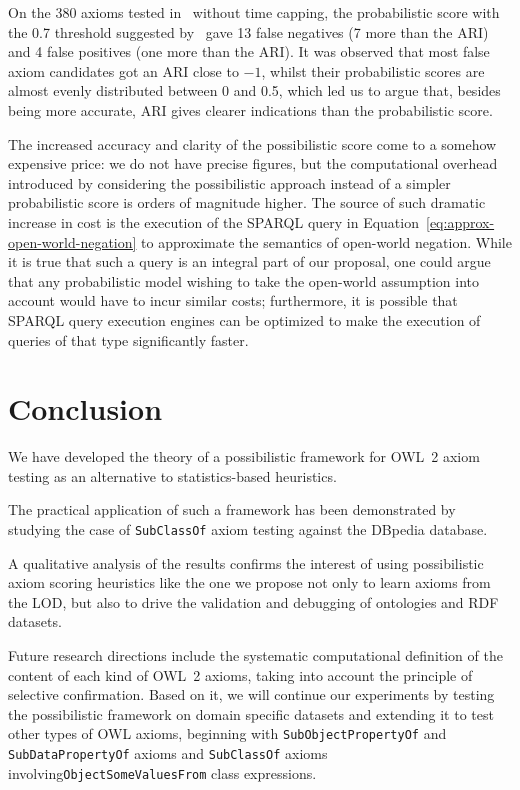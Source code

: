 \documentclass[review]{elsarticle}
\theoremstyle{definition}
\begin{document}
On the 380 axioms tested in~\cite{TettamanziFaronZuckerGandon2014ekaw}
without time capping,
the probabilistic score with the 0.7 threshold suggested by~\cite{BuehmannLehmann2012}
gave 13 false negatives (7 more than the ARI) and 4 false positives
(one more than the ARI).
It was observed that most false axiom candidates got an ARI close to $-1$,
whilst their probabilistic scores are almost evenly distributed between 0 and 0.5,
which led us to argue that, besides being more accurate,
ARI gives clearer indications than the probabilistic score.

The increased accuracy and clarity of the possibilistic score come to a somehow
expensive price: we do not have precise figures, but the computational overhead
introduced by considering the possibilistic approach instead of a simpler
probabilistic score is orders of magnitude higher. The source of such dramatic
increase in cost is the execution of the SPARQL query
in Equation~\ref{eq:approx-open-world-negation} to approximate the semantics
of open-world negation.
While it is true that such a query is an integral part of our proposal,
one could argue that any probabilistic model wishing to take the open-world
assumption into account would have to incur similar costs; furthermore,
it is possible that SPARQL query execution engines can be optimized to make
the execution of queries of that type significantly faster.


\section{Conclusion}\label{conclusion}


We have developed the theory of a possibilistic framework for OWL~2 axiom testing
as an alternative to statistics-based heuristics.

The practical application of such a framework has been demonstrated by studying
the case of \texttt{SubClassOf} axiom testing against the DBpedia database.

A qualitative analysis of the results confirms the interest of using possibilistic
axiom scoring heuristics like the one we propose not only to learn axioms from the LOD,
but also to drive the validation and debugging of ontologies and RDF datasets.

Future research directions include the systematic computational definition
of the content of each kind of OWL~2 axioms, taking into account the principle
of selective confirmation. Based on it, we will continue our experiments
by testing the possibilistic framework on domain specific datasets
and extending it to test other types of OWL axioms, beginning with
\texttt{SubObjectPropertyOf} and \texttt{SubDataPropertyOf} axioms
and \texttt{SubClassOf} axioms involving\break\texttt{ObjectSomeValuesFrom}
class expressions.
\end{document}
